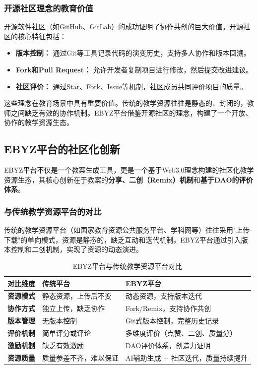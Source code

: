 \documentclass[12pt,a4paper,fontset=fandol]{ctexart}
\begin{document}
\subsubsection{开源社区理念的教育价值}
开源软件社区（如GitHub、GitLab）的成功证明了协作共创的巨大价值\cite{raymond2001}。开源社区的核心特征包括：
\begin{itemize}
    \item \textbf{版本控制：} 通过Git等工具记录代码的演变历史，支持多人协作和版本回溯。
    \item \textbf{Fork和Pull Request：} 允许开发者复制项目进行修改，然后提交改进建议。
    \item \textbf{社区评价：} 通过Star、Fork、Issue等机制，社区成员共同评价项目的质量。
\end{itemize}

这些理念在教育场景中具有重要价值。传统的教学资源往往是静态的、封闭的，教师之间缺乏有效的协作机制。EBYZ平台借鉴开源社区的理念，构建了一个开放、协作的教学资源生态。

\subsection{EBYZ平台的社区化创新}
EBYZ平台不仅是一个教案生成工具，更是一个基于Web3.0理念构建的社区化教学资源生态，其核心创新在于教案的\textbf{分享、二创（Remix）机制}和\textbf{基于DAO的评价体系}。

\subsubsection{与传统教学资源平台的对比}
传统的教学资源平台（如国家教育资源公共服务平台、学科网等）往往采用"上传-下载"的单向模式，资源是静态的，缺乏互动和迭代机制。EBYZ平台通过引入版本控制和二创机制，实现了资源的动态演进。

\begin{table}[H]
    \centering
    \caption{EBYZ平台与传统教学资源平台对比}
    \label{tab:community-comparison}
    \begin{tabular}{p{2.5cm}p{4cm}p{4cm}}
        \toprule
        \textbf{对比维度} & \textbf{传统平台} & \textbf{EBYZ平台} \\
        \midrule
        \textbf{资源模式} & 静态资源，上传后不变 & 动态资源，支持版本迭代 \\
        \midrule
        \textbf{协作方式} & 独立上传，缺乏协作 & Fork/Remix，支持协作共创 \\
        \midrule
        \textbf{版本管理} & 无版本控制 & Git式版本控制，完整历史记录 \\
        \midrule
        \textbf{评价机制} & 简单评分或评论 & 多维度评价（点赞、二创、质量分） \\
        \midrule
        \textbf{激励机制} & 缺乏有效激励 & DAO评价体系，创造力证明 \\
        \midrule
        \textbf{资源质量} & 质量参差不齐，难以保证 & AI辅助生成 + 社区迭代，质量持续提升 \\
        \bottomrule
    \end{tabular}
\end{table}
\end{document}
